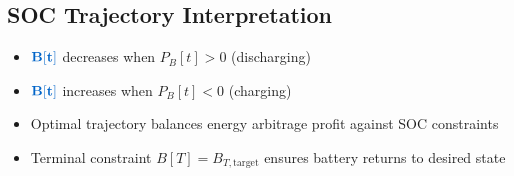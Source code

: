 \documentclass[11pt]{article}
\newcommand{\blueB}[1]{\textcolor{bluevar}{\mathbf{#1}}}      %
\begin{document}
\subsection{SOC Trajectory Interpretation}
\begin{itemize}
    \item $\blueB{B[t]}$ decreases when $P_B[t] > 0$ (discharging)
    \item $\blueB{B[t]}$ increases when $P_B[t] < 0$ (charging)
    \item Optimal trajectory balances energy arbitrage profit against SOC constraints
    \item Terminal constraint $B[T] = B_{T,\text{target}}$ ensures battery returns to desired state
\end{itemize}
\end{document}
